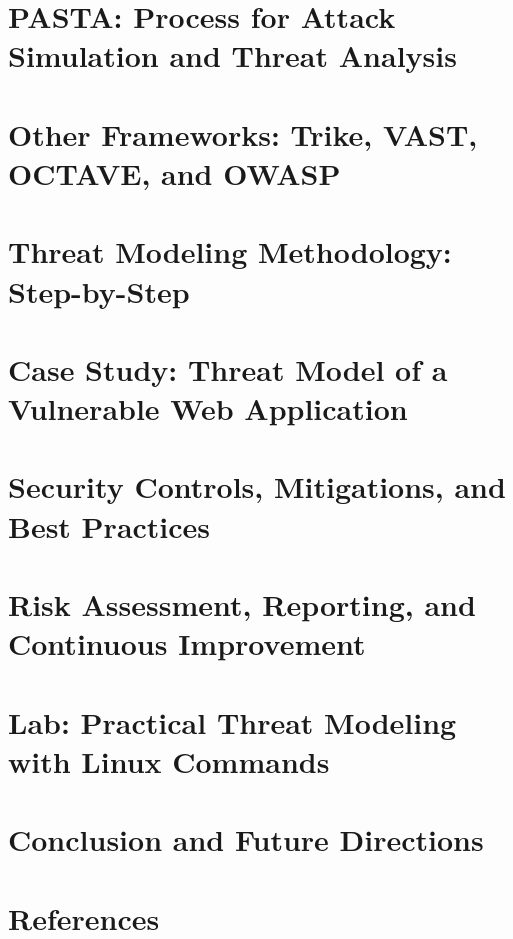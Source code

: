 \documentclass{article}
\begin{document}
\section{PASTA: Process for Attack Simulation and Threat Analysis}


\section{Other Frameworks: Trike, VAST, OCTAVE, and OWASP}


\section{Threat Modeling Methodology: Step-by-Step}


\section{Case Study: Threat Model of a Vulnerable Web Application}


\section{Security Controls, Mitigations, and Best Practices}


\section{Risk Assessment, Reporting, and Continuous Improvement}


\section{Lab: Practical Threat Modeling with Linux Commands}


\section{Conclusion and Future Directions}


\section{References}

\end{document}
